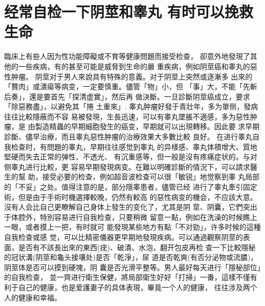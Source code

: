 \documentclass[12pt,UTF8]{ctexbook}
\begin{document}
\section{经常自检一下阴莖和睾丸
有时可以挽救生命}
臨床上有些人因为性功能障礙或不育等健康問題而接受检查，
卻意外地發現了其他的一些疾病，有的甚至可能是威脅到生命的嚴
重疾病，例如阴莖癌和睾丸的惡性肿瘤。
阴莖对于男人來說具有特殊的意義。对于阴莖上突然或逐漸多
出來的「贅肉」或潰瘍等病变，一定要慎重。儘管「物」小，但
「事」大，不能「先斬后奏」，還是要首先「探清虚實」，然后再
做決斷。一旦診斷阴莖癌成立，要求「除惡務盡」，以避免其「捲
土重來」.
睾丸肿瘤好發于青壯年，多为單侧，發病往往比較隱蔽而不容
易被發現，生長迅速，可以有睾丸墜脹不適感，多为惡性肿瘤，是
由製造精蟲的早期細胞發生的癌变，早期就可以出現轉移。因此要
求早期診斷、儘早治療，而且睾丸惡性肿瘤的治療效果大多數比較
良好。
在进行睾丸自我检查时，有問題的睾丸，早期往往感觉到睾丸
的异樣感、睾丸体積增大、質地堅硬而失去正常的弹性、不透光、
有沉重感等，但一般是沒有疼痛症状的。与对侧睾丸进行比較，更
容易早期發現病变。在難以明確診斷的情況下，可以請求醫生的幫
助，接受必要的检查，例如超音波检查可以很「敏锐」地觉察到睾
丸局部的「不妥」之处。值得注意的是，部分隱睾患者，儘管已经
进行了睾丸牽引固定術，但是由于手術时機選擇較晚，仍然有較高
的惡性病变的機会，不应該大意。
沒有人会比自己更瞭解自己身体上發生的变化了，尤其是阴
莖、阴囊，它們突出于体腔外，特別容易进行自我检查，只要稍微
留意一點，例如在洗澡的时候瞧上一眼，或者摸上一把，有时就可
能發現某些地方有點「不对勁」，许多时候的這種自我检查或感
觉，可以比精密儀器更早期地發現疾病。可以通過觀察阴莖的表
面，是否有不該長出來的東西(疣)、破潰、水泡，翻开包皮再检
查一下比較隱秘的冠状溝(阴莖和龜头接壤处)是否「乾淨」，尿
道是否乾爽(有否分泌物或流膿)，阴莖体是否可以摸到硬塊，阴
囊是否光滑平整等。男人最好每天进行「隱秘部位」的自我检查，
並一齊进行衛生保健，將局部衛生好好「打掃」一番，這樣不僅有
利于自己的健康，也是爱護妻子的具体表現，畢竟一个人的健康，
往往涉及两个人的健康和幸福。
\end{document}
